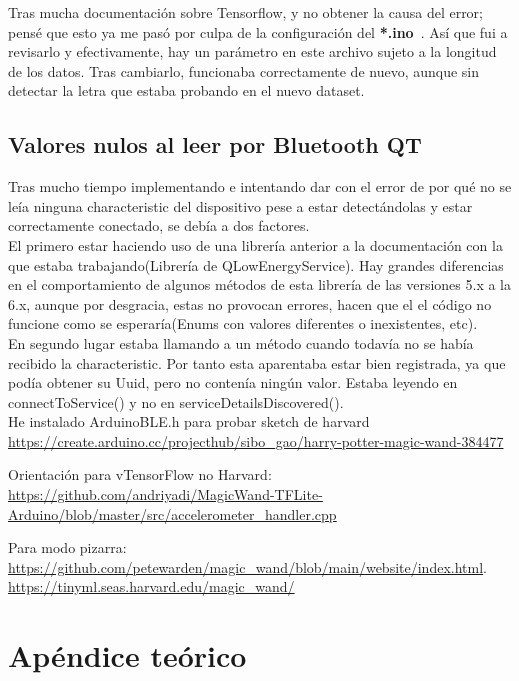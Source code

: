 Tras mucha documentación sobre Tensorflow, y no obtener la causa del error; pensé
que esto ya me pasó por culpa de la configuración del \small\textbf{*.ino}\normalsize~.
Así que fui a revisarlo y efectivamente, hay un parámetro en este archivo sujeto a
la longitud de los datos. Tras cambiarlo, funcionaba correctamente de nuevo, aunque
sin detectar la letra que estaba probando en el nuevo dataset.


\subsection{Valores nulos al leer por Bluetooth QT}
Tras mucho tiempo implementando e intentando dar con el error de por qué no se
leía ninguna characteristic del dispositivo pese a estar detectándolas y estar
correctamente conectado, se debía a dos factores.\\
El primero estar haciendo uso de una librería anterior a la documentación con
la que estaba trabajando(Librería de QLowEnergyService). Hay grandes diferencias
en el comportamiento de algunos métodos de esta librería de las versiones 5.x
a la 6.x, aunque por desgracia, estas no provocan errores, hacen que el
el código no funcione como se esperaría(Enums con valores diferentes o inexistentes, etc).\\
En segundo lugar estaba llamando a un método cuando todavía no se había recibido
la characteristic. Por tanto esta aparentaba estar bien registrada, ya que
podía obtener su Uuid, pero no contenía ningún valor.
Estaba leyendo en connectToService() y no en serviceDetailsDiscovered().\\

He instalado  ArduinoBLE.h para probar sketch de harvard\\
\url{https://create.arduino.cc/projecthub/sibo_gao/harry-potter-magic-wand-384477}


Orientación para vTensorFlow no Harvard:
\url{https://github.com/andriyadi/MagicWand-TFLite-Arduino/blob/master/src/accelerometer_handler.cpp}


Para modo pizarra:
\url{https://github.com/petewarden/magic_wand/blob/main/website/index.html}.
\url{https://tinyml.seas.harvard.edu/magic_wand/}


\section{Apéndice teórico}